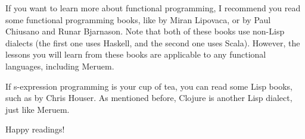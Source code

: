 If you want to learn more about functional programming, I recommend you read some functional programming books, like
 by Miran Lipovaca, or  by Paul Chiusano and Runar Bjarnason. 
Note that both of these books use non-Lisp dialects (the first one uses Haskell, and the second one uses Scala). However, the lessons you will learn
from these books are applicable to any functional languages, including Meruem.

If s-expression programming is your cup of tea, you can read some Lisp books, such as  by Chris Houser. As mentioned before, Clojure
is another Lisp dialect, just like Meruem.

Happy readings!